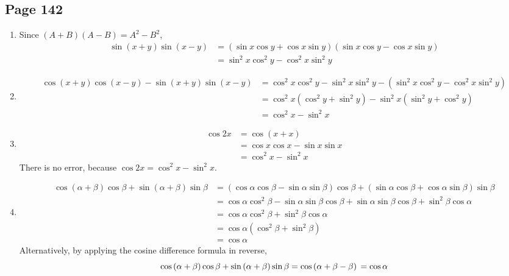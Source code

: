 \documentclass{article}
\newenvironment{solutions}[1]
{\subsection*{#1}
 \begin{enumerate}[leftmargin=1.5em]}
{\end{enumerate}}
\newcommand{\solution}{\item}
\begin{document}
\begin{solutions}{Page 142}
\solution %
Since $(A+B)(A-B)=A^2-B^2$,
\begin{align*}
\sin\left(x+y\right)\sin\left(x-y\right) &= \left(\sin{x}\cos{y} + \cos{x}\sin{y}\right) \left(\sin{x}\cos{y} - \cos{x}\sin{y}\right) \\
&= \sin^{2}{x}\cos^{2}{y} - \cos^{2}{x}\sin^{2}{y}
\end{align*}

\solution %
\begin{align*}
\cos\left(x+y\right)\cos\left(x-y\right) - \sin\left(x+y\right)\sin\left(x-y\right) &= \cos^{2}{x}\cos^{2}{y} - \sin^{2}{x}\sin^{2}{y} - \left(\sin^{2}{x}\cos^{2}{y} - \cos^{2}{x}\sin^{2}{y}\right) \\
&= \cos^{2}{x}\left(\cos^{2}{y} + \sin^{2}{y}\right) - \sin^{2}{x}\left(\sin^2{y}+\cos^{2}{y}\right) \\
&= \cos^{2}{x} - \sin^{2}{x}
\end{align*}

\solution %
\begin{align*}
\cos{2x} &= \cos\left(x+x\right) \\
&= \cos{x}\cos{x}-\sin{x}\sin{x} \\
&= \cos^{2}{x} - \sin^{2}{x}
\end{align*}
There is no error, because $\cos{2x}=\cos^{2}{x} - \sin^{2}{x}$.

\solution %
\begin{align*}
\cos\left(\alpha+\beta\right)\cos{\beta} + \sin\left(\alpha+\beta\right)\sin{\beta} &= \left(\cos{\alpha}\cos{\beta}-\sin{\alpha}\sin{\beta}\right)\cos{\beta} + \left(\sin{\alpha}\cos{\beta}+\cos{\alpha}\sin{\beta}\right)\sin{\beta} \\
&= \cos{\alpha}\cos^{2}{\beta} - \sin{\alpha}\sin{\beta}\cos{\beta} + \sin{\alpha}\sin{\beta}\cos{\beta}+\sin^{2}{\beta}\cos{\alpha} \\
&= \cos{\alpha}\cos^{2}{\beta} + \sin^{2}{\beta}\cos{\alpha} \\
&= \cos{\alpha} \left(\cos^{2}{\beta}+\sin^{2}{\beta}\right) \\
&= \cos{\alpha}
\end{align*}
Alternatively, by applying the cosine difference formula in reverse,
\[
\cos\left(\alpha+\beta\right)\cos{\beta} + \sin\left(\alpha+\beta\right)\sin{\beta} = \cos\left(\alpha+\beta - \beta\right) \\
= \cos{\alpha}
\]
\end{solutions}
\end{document}
